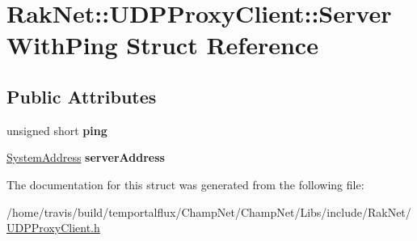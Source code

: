 \hypertarget{struct_rak_net_1_1_u_d_p_proxy_client_1_1_server_with_ping}{\section{Rak\-Net\-:\-:U\-D\-P\-Proxy\-Client\-:\-:Server\-With\-Ping Struct Reference}
\label{struct_rak_net_1_1_u_d_p_proxy_client_1_1_server_with_ping}
}
\subsection*{Public Attributes}
\begin{DoxyCompactItemize}
\item 
\hypertarget{struct_rak_net_1_1_u_d_p_proxy_client_1_1_server_with_ping_a612dc69206fd834eac34780cf01f53a1}{unsigned short {\bfseries ping}}\label{struct_rak_net_1_1_u_d_p_proxy_client_1_1_server_with_ping_a612dc69206fd834eac34780cf01f53a1}

\item 
\hypertarget{struct_rak_net_1_1_u_d_p_proxy_client_1_1_server_with_ping_a80a874fc4a75c5273db3fd74a8a0525d}{\hyperlink{struct_rak_net_1_1_system_address}{System\-Address} {\bfseries server\-Address}}\label{struct_rak_net_1_1_u_d_p_proxy_client_1_1_server_with_ping_a80a874fc4a75c5273db3fd74a8a0525d}

\end{DoxyCompactItemize}


The documentation for this struct was generated from the following file\-:\begin{DoxyCompactItemize}
\item 
/home/travis/build/temportalflux/\-Champ\-Net/\-Champ\-Net/\-Libs/include/\-Rak\-Net/\hyperlink{_u_d_p_proxy_client_8h}{U\-D\-P\-Proxy\-Client.\-h}\end{DoxyCompactItemize}
